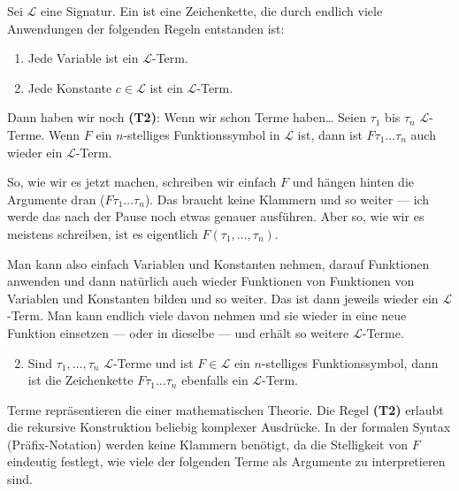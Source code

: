 \begin{math-stroke}
Sei $\mathcal{L}$ eine Signatur. Ein  ist eine Zeichenkette, die durch endlich viele Anwendungen der folgenden Regeln entstanden ist:
\begin{enumerate}[label=\textbf{(T\arabic*)}, start=0]
    \item Jede Variable ist ein $\mathcal{L}$-Term.
    \item Jede Konstante $c \in \mathcal{L}$ ist ein $\mathcal{L}$-Term.
\end{enumerate}
\end{math-stroke}

\begin{spoken-clean}[00:43:25 - 00:45:05]
Dann haben wir noch \textbf{(T2)}: Wenn wir schon Terme haben\dots {} Seien $\tau_1$ bis $\tau_n$ $\mathcal{L}$-Terme. Wenn $F$ ein $n$-stelliges Funktionssymbol in $\mathcal{L}$ ist, dann ist $F \tau_1 \dots \tau_n$ auch wieder ein $\mathcal{L}$-Term. 

So, wie wir es jetzt machen, schreiben wir einfach $F$ und hängen hinten die Argumente dran ($F \tau_1 \dots \tau_n$). Das braucht keine Klammern und so weiter --- ich werde das nach der Pause noch etwas genauer ausführen. Aber so, wie wir es meistens schreiben, ist es eigentlich $F(\tau_1, \dots, \tau_n)$. 

Man kann also einfach Variablen und Konstanten nehmen, darauf Funktionen anwenden und dann natürlich auch wieder Funktionen von Funktionen von Variablen und Konstanten bilden und so weiter. Das ist dann jeweils wieder ein $\mathcal{L}$-Term. Man kann endlich viele davon nehmen und sie wieder in eine neue Funktion einsetzen --- oder in dieselbe --- und erhält so weitere $\mathcal{L}$-Terme.
\end{spoken-clean}

\begin{math-stroke}
\begin{enumerate}[label=\textbf{(T\arabic*)}]
    \setcounter{enumi}{1}
    \item Sind $\tau_1, \dots, \tau_n$ $\mathcal{L}$-Terme und ist $F \in \mathcal{L}$ ein $n$-stelliges Funktionssymbol, dann ist die Zeichenkette $F \tau_1 \dots \tau_n$ ebenfalls ein $\mathcal{L}$-Term.
\end{enumerate}

\begin{explanation-of-steps}
Terme repräsentieren die  einer mathematischen Theorie. Die Regel \textbf{(T2)} erlaubt die rekursive Konstruktion beliebig komplexer Ausdrücke. In der formalen Syntax (Präfix-Notation) werden keine Klammern benötigt, da die Stelligkeit von $F$ eindeutig festlegt, wie viele der folgenden Terme als Argumente zu interpretieren sind.
\end{explanation-of-steps}
\end{math-stroke}

